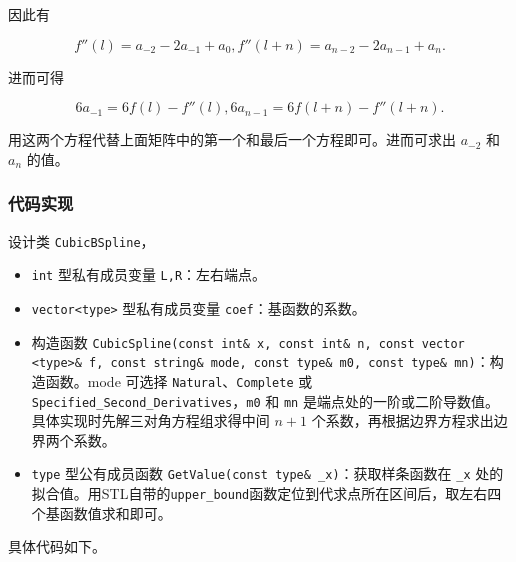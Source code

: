 \documentclass{ctexart}
\begin{document}
因此有

\begin{equation}
f''(l)=a_{-2}-2a_{-1}+a_0,f''(l+n)=a_{n-2}-2a_{n-1}+a_n.
\end{equation}

进而可得

\begin{equation}
6a_{-1}=6f(l)-f''(l),6a_{n-1}=6f(l+n)-f''(l+n).
\end{equation}

用这两个方程代替上面矩阵中的第一个和最后一个方程即可。进而可求出 $a_{-2}$ 和 $a_n$ 的值。

\subsubsection{代码实现}

设计类 \verb|CubicBSpline|，

\begin{itemize}
\item \verb|int| 型私有成员变量 \verb|L,R|：左右端点。
\item \verb|vector<type>| 型私有成员变量 \verb|coef|：基函数的系数。
\item 构造函数 \verb|CubicSpline(const int& x, const int& n, const vector <type>& f, const string& mode, const type& m0, const type& mn)|：构造函数。mode 可选择 \verb|Natural|、\verb|Complete| 或 \verb|Specified_Second_Derivatives|，\verb|m0| 和 \verb|mn| 是端点处的一阶或二阶导数值。具体实现时先解三对角方程组求得中间 $n+1$ 个系数，再根据边界方程求出边界两个系数。
\item \verb|type| 型公有成员函数 \verb|GetValue(const type& _x)|：获取样条函数在 \verb|_x| 处的拟合值。用STL自带的\verb|upper_bound|函数定位到代求点所在区间后，取左右四个基函数值求和即可。
\end{itemize}

具体代码如下。
\end{document}
